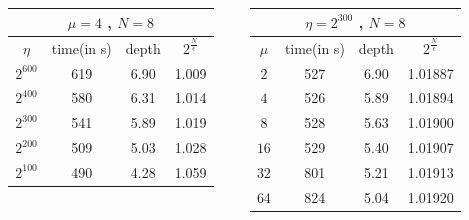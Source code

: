 \documentclass{beamer}
\begin{document}
\begin{frame}
  \begin{columns}
    \begin{column}[c]{4cm}
    \end{column}
    \begin{column}[c]{4cm}
      \resizebox{3cm}{!} {
        \begin{tabular}{|c|c|c|c||}
          \hline
          \multicolumn{4}{|c||}{$\mu = 4$ , $N=8$} \\
          \hline
          $\eta$ &  time(in s)  & depth & $2^{\frac{N}{\epsilon}}$ \\
          \hline
          $2^{600}$ & 619  & 6.90 & 1.009 \\
          $2^{400}$ &  580 & 6.31 & 1.014 \\  
          $2^{300}$ &  541 & 5.89 & 1.019 \\
          $2^{200}$ &  509 & 5.03 & 1.028 \\
          $2^{100}$ &  490 & 4.28 & 1.059 \\
          \hline
        \end{tabular}
      }
    \end{column}

    \begin{column}[c]{4cm}
      \resizebox{3cm}{!} {
        \begin{tabular}{|c|c|c|c||}
          \hline
          \multicolumn{4}{|c||}{$\eta = 2^{300}$ , $N=8$} \\
          \hline
          $\mu$ &  time(in s)  & depth & $2^{\frac{N}{\epsilon}}$ \\
          \hline
          $2$ & 527  & 6.90 & 1.01887 \\
          $4$ & 526 & 5.89 & 1.01894 \\
          $8$ & 528  & 5.63 & 1.01900 \\
          $16$ & 529  & 5.40 & 1.01907 \\
          $32$ & 801  & 5.21 & 1.01913 \\
          $64$ & 824  & 5.04 & 1.01920 \\
          \hline
        \end{tabular}
      }
    \end{column}
  \end{columns} 


\end{frame}
\end{document}
